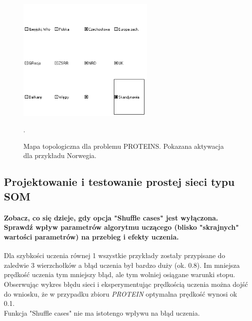 \begin{figure}[h]
\begin{centering}
\includegraphics[width=0.6\textwidth]{dane/part3/zad2/norwegia}
\caption{Mapa topologiczna dla problemu PROTEINS. Pokazana aktywacja dla przykładu Norwegia.\label{fig:norwegia}}.
\end{centering}
\end{figure}

\subsection{Projektowanie i testowanie prostej sieci typu SOM}
 \paragraph{\textbf{Zobacz, co się dzieje, gdy opcja "Shuffle cases" jest wyłączona. Sprawdź wpływ parametrów algorytmu uczącego (blisko "skrajnych" wartości parametrów) na przebieg i efekty uczenia.}}
Dla szybkości uczenia równej 1 wszystkie przykłady zostały przypisane do zaledwie 3 wierzchołków a błąd uczenia był bardzo duży (ok. 0.8). Im mniejsza prędkość uczenia tym mniejszy błąd, ale tym wolniej osiągane warunki stopu. Obserwując wykres błędu sieci i eksperymentując prędkością uczenia można dojść do wniosku, że w przypadku zbioru \emph{PROTEIN} optymalna prędkość wynosi ok 0.1.\\Funkcja "Shuffle cases" nie ma istotengo wpływu na błąd uczenia.